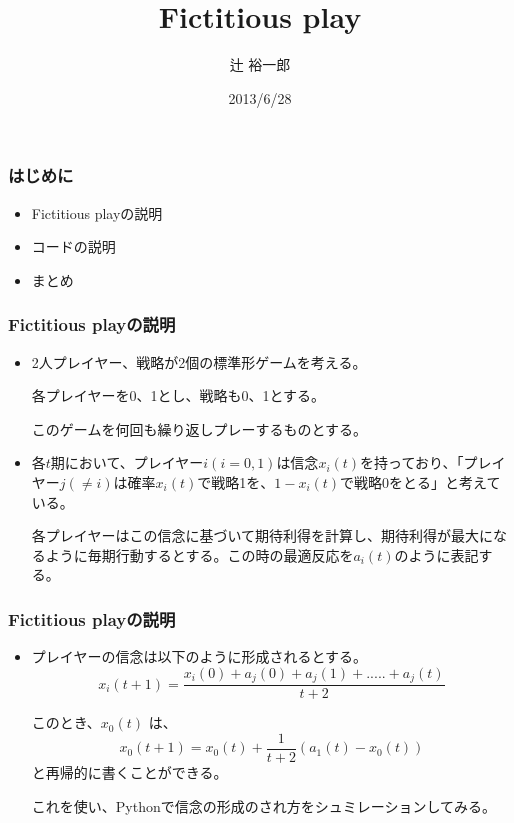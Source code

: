 \documentclass[dvipdfmx,fleqn]{beamer}
\title{\Large Fictitious play}
\author{\large 辻 裕一郎}
\date{\small 2013/6/28}
\begin{document}
\sffamily
\gtfamily


\begin{frame}
  \titlepage
  \thispagestyle{empty}
\end{frame}

\setcounter{framenumber}{0}


\begin{frame}
\frametitle{はじめに}
\begin{itemize}\setlength{\parskip}{0.5em}
\item
Fictitious playの説明
\item
コードの説明
\item
まとめ
\end{itemize}
\end{frame}


\begin{frame}
\frametitle{Fictitious playの説明}
\begin{itemize}\setlength{\parskip}{0.5em}
\item
2人プレイヤー、戦略が2個の標準形ゲームを考える。

各プレイヤーを0、1とし、戦略も0、1とする。

このゲームを何回も繰り返しプレーするものとする。
\item
各$t$期において、プレイヤー$i(i=0, 1)$は信念$x_{i} (t)$を持っており、「プレイヤー$j(\neq i)$は確率$x_{i} (t)$で戦略1を、$1 - x_{i} (t)$で戦略0をとる」と考えている。

各プレイヤーはこの信念に基づいて期待利得を計算し、期待利得が最大になるように毎期行動するとする。この時の最適反応を$a_{i} (t)$のように表記する。

\end{itemize}
\end{frame}


\begin{frame}
\frametitle{Fictitious playの説明}
\begin{itemize}\setlength{\parskip}{0.5em}
\item
プレイヤーの信念は以下のように形成されるとする。
\[
 x_i(t+1) = \frac{x_i(0)+a_j(0)+a_j(1)+.....+a_j(t)}{t+2}
\]

 このとき、$x_0(t)$ は、
\[
x_0(t+1)
= x_0(t) + \frac{1}{t+2} (a_1(t) - x_0(t))
\]
と再帰的に書くことができる。

これを使い、Pythonで信念の形成のされ方をシュミレーションしてみる。
\end{itemize}
\end{frame}
\end{document}
